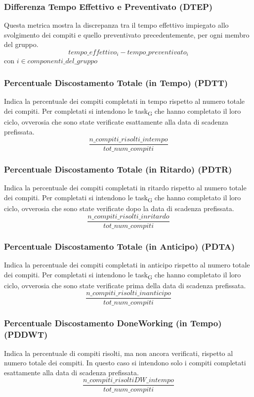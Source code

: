 \subsubsection{Differenza Tempo Effettivo e Preventivato (DTEP)}
Questa metrica mostra la discrepanza tra il tempo effettivo impiegato allo svolgimento dei compiti e quello preventivato precedentemente, per ogni membro del gruppo.
\[tempo\_effettivo_i - tempo\_preventivato_i\]
con $i \in {componenti\_del\_gruppo}$
\subsubsection{Percentuale Discostamento Totale (in Tempo) (PDTT)}
Indica la percentuale dei compiti completati in tempo rispetto al numero totale dei compiti. Per completati si intendono le task\textsubscript{G} che hanno completato il loro ciclo, ovverosia che sono state verificate esattamente alla data di scadenza prefissata.
\[\frac{n\_compiti\_risolti\_intempo}{tot\_num\_compiti}\]
\subsubsection{Percentuale Discostamento Totale (in Ritardo) (PDTR)}
Indica la percentuale dei compiti completati in ritardo rispetto al numero totale dei compiti. Per completati si intendono le task\textsubscript{G} che hanno completato il loro ciclo, ovverosia che sono state verificate dopo la data di scadenza prefissata.
\[\frac{n\_compiti\_risolti\_inritardo}{tot\_num\_compiti}\]
\subsubsection{Percentuale Discostamento Totale (in Anticipo) (PDTA)}
Indica la percentuale dei compiti completati in anticipo rispetto al numero totale dei compiti. Per completati si intendono le task\textsubscript{G} che hanno completato il loro ciclo, ovverosia che sono state verificate prima della data di scadenza prefissata.
\[\frac{n\_compiti\_risolti\_inanticipo}{tot\_num\_compiti}\]

\subsubsection{Percentuale Discostamento DoneWorking (in Tempo) (PDDWT)}
Indica la percentuale di compiti risolti, ma non ancora verificati, rispetto al numero totale dei compiti. In questo caso si intendono solo i compiti completati esattamente alla data di scadenza prefissata.
\[\frac{n\_compiti\_risoltiDW\_intempo}{tot\_num\_compiti}\]
